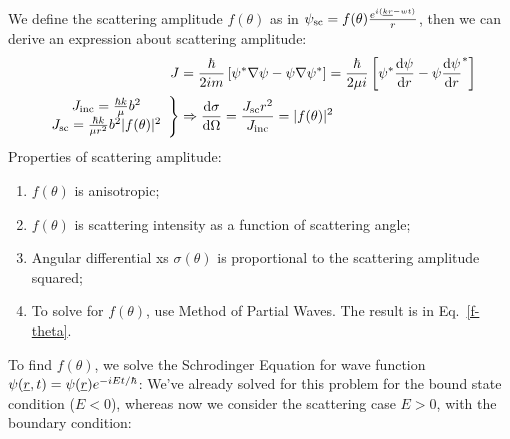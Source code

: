 \documentclass{school-22.101-notes}
\begin{document}
We define the scattering amplitude $f(\theta)$ as in $\psi_{\mathrm{sc}} = f(\theta) \frac{e^{i (\underline{k} \underline{r} - wt)}}{r}$, then we can derive an expression about scattering amplitude:
\begin{align}
J &= \frac{\hbar}{2 i m} \left[ \psi^* \nabla \psi - \psi \nabla \psi^* \right] = \frac{\hbar}{2 \mu i} \left[ \psi^* \frac{\mathrm{d}\psi}{\mathrm{d}r} - \psi \frac{\mathrm{d}\psi}{\mathrm{d}r}^* \right] \\
\left. \begin{array}{c}
J_{\mathrm{inc}} = \frac{\hbar k}{\mu} b^2  \\
J_{\mathrm{sc}} = \frac{\hbar k}{\mu r^2} b^2 |f(\theta)|^2 \\
\end{array} \right\} &\Rightarrow \frac{\mathrm{d}\sigma}{\mathrm{d}\Omega} = \frac{J_{\mathrm{sc}} r^2}{ J_{\mathrm{inc}}} = |f(\theta)|^2 
\end{align}
Properties of scattering amplitude: 
\begin{enumerate}
\item $f(\theta)$ is anisotropic; 
\item $f(\theta)$ is scattering intensity as a function of scattering angle; 
\item Angular differential xs $\sigma(\theta)$ is proportional to the scattering amplitude squared; 
\item To solve for $f(\theta)$, use Method of Partial Waves. The result is in Eq.~\ref{f-theta}. 
\end{enumerate}

To find $f(\theta)$, we solve the Schrodinger Equation for wave function $\psi(\underline{r}, t) = \psi(\underline{r}) e^{-iEt/\hbar}$:
We've already solved for this problem for the bound state condition ($E <0$), whereas now we consider the scattering case $E>0$, with the boundary condition:
\end{document}
